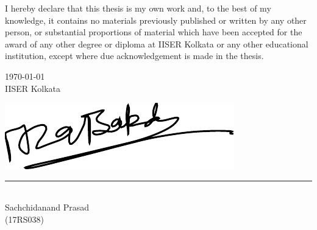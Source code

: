 I hereby declare that this thesis is my own work and, to the best of my knowledge, it contains no materials previously published or written by any other person, or substantial proportions of material which have been accepted for the award of any other degree or diploma at IISER Kolkata or any other educational institution, except where due acknowledgement is made in the thesis.

\vspace{3cm}

\begin{minipage}{0.45\linewidth}
    \begin{flushleft}
        \today\\[0.5ex]
        IISER Kolkata
    \end{flushleft}
\end{minipage}
\hfill
\begin{minipage}{0.45\linewidth}
    \begin{flushright}
        \includegraphics[scale=0.70]{figures/signature_mine.pdf}
        \rule{4.6cm}{0.15mm}\\[0.5ex]
        Sachchidanand Prasad \\[0.5ex]
        (17RS038)
    \end{flushright}
\end{minipage}


